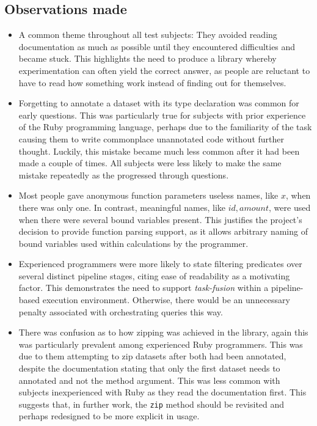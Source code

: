 \subsection{Observations made}
\begin{itemize}
  \item A common theme throughout all test subjects: They avoided reading documentation as much as possible until they encountered difficulties and became stuck.
  This highlights the need to produce a library whereby experimentation can often yield the correct answer, as people are reluctant to have to read how something work instead of finding out for themselves.

  \item Forgetting to annotate a dataset with its type declaration was common for early questions. This was particularly true for subjects with prior experience of the Ruby programming language, perhaps due to the familiarity of the task causing them to write commonplace unannotated code without further thought. Luckily, this mistake became much less common after it had been made a couple of times. All subjects were less likely to make the same mistake repeatedly as the progressed through questions.

  \item Most people gave anonymous function parameters useless names, like $x$, when there was only one. In contrast, meaningful names, like $id, amount$, were used when there were several bound variables present.
    This justifies the project's decision to provide function parsing support, as it allows arbitrary naming of bound variables used within calculations by the programmer.

  \item Experienced programmers were more likely to state filtering predicates over several distinct pipeline stages, citing ease of readability as a motivating factor. This demonstrates the need to support \emph{task-fusion} within a pipeline-based execution environment. Otherwise, there would be an unnecessary penalty associated with orchestrating queries this way.

  \item There was confusion as to how zipping was achieved in the library, again this was particularly prevalent among experienced Ruby programmers. This was due to them attempting to zip datasets after both had been annotated, despite the documentation stating that only the first dataset needs to annotated and not the method argument. This was less common with subjects inexperienced with Ruby as they read the documentation first. This suggests that, in further work, the \verb|zip| method should be revisited and perhaps redesigned to be more explicit in usage.


\end{itemize}
